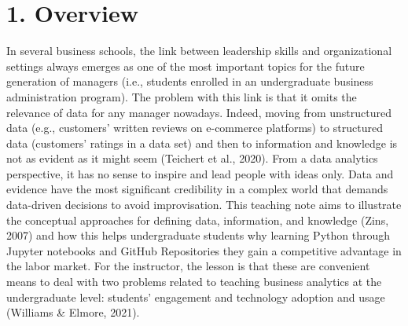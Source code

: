 \documentclass[letterpaper,11pt]{article}
\begin{document}
\section{1. Overview}
In several business schools, the link between leadership skills and organizational settings always emerges as one of the most important topics for the future generation of managers (i.e., students enrolled in an undergraduate business administration program). The problem with this link is that it omits the relevance of data for any manager nowadays. Indeed, moving from unstructured data (e.g., customers' written reviews on e-commerce platforms) to structured data (customers' ratings in a data set) and then to information and knowledge is not as evident as it might seem (Teichert et al., 2020). From a data analytics perspective, it has no sense to inspire and lead people with ideas only. Data and evidence have the most significant credibility in a complex world that demands data-driven decisions to avoid improvisation. This teaching note aims to illustrate the conceptual approaches for defining data, information, and knowledge (Zins, 2007) and how this helps undergraduate students why learning Python through Jupyter notebooks and GitHub Repositories they gain a competitive advantage in the labor market. For the instructor, the lesson is that these are convenient means to deal with two problems related to teaching business analytics at the undergraduate level: students’ engagement and technology adoption and usage (Williams \& Elmore, 2021).
\end{document}
